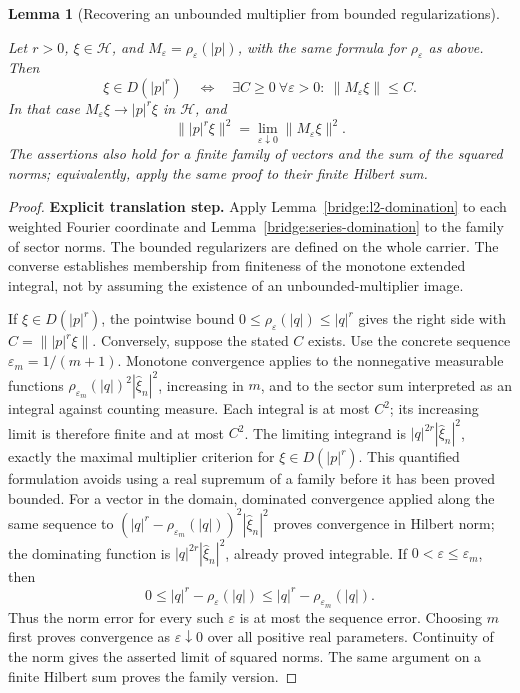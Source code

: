\documentclass[11pt,a4paper]{article}
\newtheorem{lemma}[theorem]{Lemma}
\theoremstyle{definition}
\theoremstyle{remark}
\newcommand{\proofid}[1]{\par\smallskip{\normalfont\scriptsize\color{inkblue}Stable ID: \nolinkurl{#1}}\par\smallskip}
\begin{document}
\begin{lemma}[Recovering an unbounded multiplier from bounded regularizations]
\label{reg:regularization}
\proofid{reg:regularization}
\par{}\par\smallskip

Let \(r>0\), \(\xi\in\mathcal H\), and
\(M_\varepsilon=\rho_\varepsilon(|p|)\), with the same formula for
\(\rho_\varepsilon\) as above.  Then
\[
 \xi\in D(|p|^r)
 \quad\Longleftrightarrow\quad
 \exists C\geq0\ \forall\varepsilon>0:\ \|M_\varepsilon\xi\|\leq C.
\]
In that case \(M_\varepsilon\xi\to |p|^r\xi\) in \(\mathcal H\), and
\[
 \||p|^r\xi\|^2=\lim_{\varepsilon\downarrow0}
                    \|M_\varepsilon\xi\|^2.
\]
The assertions also hold for a finite family of vectors and the sum of the
squared norms; equivalently, apply the same proof to their finite Hilbert
sum.
\end{lemma}
\begin{proof}
\noindent\textbf{Explicit translation step.} Apply Lemma~\ref{bridge:l2-domination} to each weighted Fourier
coordinate and Lemma~\ref{bridge:series-domination} to the family of
sector norms. The bounded regularizers are defined on the whole
carrier. The converse establishes membership from finiteness of the
monotone extended integral, not by assuming the existence of an
unbounded-multiplier image.

If \(\xi\in D(|p|^r)\), the pointwise bound
\(0\leq\rho_\varepsilon(|q|)\leq|q|^r\) gives the right side with
\(C=\||p|^r\xi\|\). Conversely, suppose the stated \(C\) exists.
Use the concrete sequence \(\varepsilon_m=1/(m+1)\). Monotone
convergence applies to the nonnegative measurable functions
\(\rho_{\varepsilon_m}(|q|)^2|\widehat\xi_n|^2\), increasing in
\(m\), and to the sector sum interpreted as an integral against
counting measure. Each integral is at most \(C^2\); its increasing
limit is therefore finite and at most \(C^2\). The limiting
integrand is \(|q|^{2r}|\widehat\xi_n|^2\), exactly the maximal
multiplier criterion for \(\xi\in D(|p|^r)\).
This quantified formulation avoids using a real supremum of a family
before it has been proved bounded. For a vector in the domain,
dominated convergence applied along the same sequence to
\((|q|^r-\rho_{\varepsilon_m}(|q|))^2|\widehat\xi_n|^2\)
proves convergence in Hilbert norm; the dominating function is
\(|q|^{2r}|\widehat\xi_n|^2\), already proved integrable.
If \(0<\varepsilon\leq\varepsilon_m\), then
\[
 0\leq |q|^r-\rho_\varepsilon(|q|)
 \leq |q|^r-\rho_{\varepsilon_m}(|q|).
\]
Thus the norm error for every such \(\varepsilon\) is at most the
sequence error. Choosing \(m\) first proves convergence as
\(\varepsilon\downarrow0\) over all positive real parameters.
Continuity of the norm gives the asserted limit of squared norms.
The same argument on a finite Hilbert sum proves the family version.
\end{proof}
\end{document}
